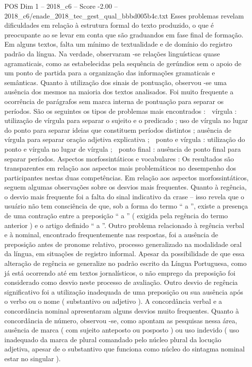 \begin{textsample}{POS Dim 1 – 2018\_c6 – Score -2.00 – 2018\_c6/enade\_2018\_tec\_gest\_qual\_bbbd005b4c.txt}
Esses problemas revelam dificuldades em relação à estrutura formal do texto produzido, o que é preocupante ao se levar em conta que são graduandos em fase final de formação.
Em alguns textos, falta um mínimo de textualidade e de domínio do registro padrão da língua.
Na verdade, observaram -se relações linguísticas quase agramaticais, como as estabelecidas pela sequência de gerúndios sem o apoio de um ponto de partida para a organização das informações gramaticais e semânticas.
Quanto à utilização dos sinais de pontuação, observou -se uma ausência dos mesmos na maioria dos textos analisados.
Foi muito frequente a ocorrência de parágrafos sem marca interna de pontuação para separar os períodos.
São os seguintes os tipos de problemas mais encontrados :  vírgula : utilização de vírgula para separar o sujeito e o predicado ; uso de vírgula no lugar do ponto para separar ideias que constituem períodos distintos ; ausência de vírgula para separar oração adjetiva explicativa ;  ponto e vírgula : utilização do ponto e vírgula no lugar de vírgula ;  ponto final : ausência de ponto final para separar períodos.
Aspectos morfossintáticos e vocabulares : Os resultados são transparentes em relação aos aspectos mais problemáticos no desempenho dos participantes nestas duas competências.
Em relação aos aspectos morfossintáticos, seguem algumas observações sobre os desvios mais frequentes.
Quanto à regência, o desvio mais frequente foi a falta do sinal indicativo da crase – isso revela que o usuário não tem consciência de que, sob a forma do termo “ a ”, existe a presença de uma contração entre a preposição “ a ” ( exigida pela regência do termo anterior ) e o artigo definido “ a ”.
Outro problema relacionado à regência verbal e à nominal, encontrado frequentemente nas respostas, foi a ausência de preposição antes de pronome relativo, processo generalizado na modalidade oral da língua, em situações de registro informal.
Apesar da possibilidade de que essa alteração de regência se generalize no padrão escrito da Língua Portuguesa, como já está ocorrendo até em textos jornalísticos, o não emprego da preposição foi considerado como desvio neste processo de avaliação.
Outro desvio de regência significativo foi a utilização inadequada de uma preposição ou sua ausência após o verbo ou o nome ( substantivo ou adjetivo ).
A concordância verbal e a concordância nominal apresentaram alguns desvios muito frequentes.
Quanto à concordância de número, observou -se, como apontam as pesquisas nessa área, ausência de marca ( com sujeito anteposto ou posposto ) ou uso indevido ( uso inadequado da marca de plural comandado pelo núcleo plural da locução adjetiva, apesar de o substantivo que funciona como núcleo do sintagma nominal estar no singular ).

\end{textsample}
